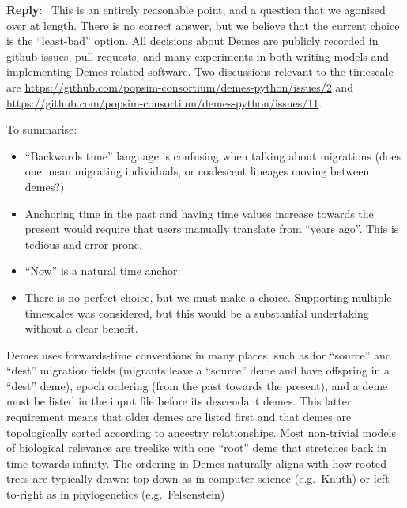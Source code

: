 \documentclass[11pt]{article}
\newcounter{reviewer}
\newcounter{point}[reviewer]
\newenvironment{reply}
   {\medskip \noindent \begin{sf}\textbf{Reply}:\  }
   {\medskip \end{sf}}
\begin{document}
\begin{reply}
This is an entirely reasonable point, and a question that
we agonised over at length. There is no correct answer, but
we believe that the current choice is the ``least-bad'' option.
All decisions about Demes are publicly recorded in github issues,
pull requests, and many experiments in both writing models and implementing
Demes-related software.
Two discussions relevant to the timescale are
\url{https://github.com/popsim-consortium/demes-python/issues/2}
and
\url{https://github.com/popsim-consortium/demes-python/issues/11}.

To summarise:
\begin{itemize}
\item
``Backwards time'' language is confusing when talking about migrations
(does one mean migrating individuals, or coalescent lineages moving
between demes?)
\item
Anchoring time in the past and having time values increase towards
the present would require that users manually translate from ``years ago''.
This is tedious and error prone.
\item
``Now'' is a natural time anchor.
\item
There is no perfect choice, but we must make a choice.
Supporting multiple timescales was considered, but this would be a
substantial undertaking without a clear benefit.
\end{itemize}

Demes uses forwards-time conventions in many places, such as for
``source'' and ``dest'' migration fields (migrants leave a ``source''
deme and have offspring in a ``dest'' deme),
epoch ordering (from the past towards the present),
and a deme must be listed in the input file before its
descendant demes.
This latter requirement means that older demes are listed first and that
demes are topologically sorted according to ancestry relationships.
Most non-trivial models of biological relevance are treelike with one
``root'' deme that stretches back in time towards infinity.
The ordering in Demes naturally aligns with how rooted trees are typically drawn:
top-down as in computer science (e.g.~Knuth)
or left-to-right as in phylogenetics
(e.g.~Felsenstein)

\end{reply}
\end{document}
